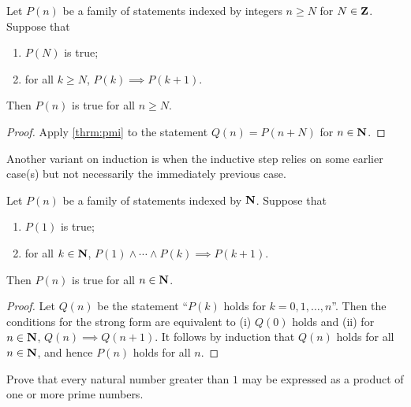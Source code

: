 \begin{corollary}
Let $P(n)$ be a family of statements indexed by integers $n \ge N$ for $N\in\mathbf Z$. Suppose that 
\begin{enumerate}[label=(\roman*)]
\item $P(N)$ is true;
\item for all $k \ge N$, $P(k) \implies P(k+1)$. 
\end{enumerate}
Then $P(n)$ is true for all $n \ge N$.
\end{corollary}

\begin{proof}
Apply \cref{thrm:pmi} to the statement $Q(n)=P(n+N)$ for $n\in\mathbf N$.
\end{proof}

Another variant on induction is when the inductive step relies on some earlier case(s) but not necessarily the immediately previous case.

\begin{theorem}
Let $P(n)$ be a family of statements indexed by $\mathbf N$. Suppose that
\begin{enumerate}[label=(\roman*)]
\item $P(1)$ is true;
\item for all $k\in\mathbf N$, $P(1)\land\cdots\land P(k)\implies P(k+1)$.
\end{enumerate}
Then $P(n)$ is true for all $n\in\mathbf N$.
\end{theorem}

\begin{proof}
Let $Q(n)$ be the statement ``$P(k)$ holds for $k=0,1,\dots,n$''. Then the conditions for the strong form are equivalent to (i) $Q(0)$ holds and (ii) for $n\in\mathbf N$, $Q(n)\implies Q(n+1)$. It follows by induction that $Q(n)$ holds for all $n\in\mathbf N$, and hence $P(n)$ holds for all $n$.
\end{proof}

\begin{exercise}
Prove that every natural number greater than $1$ may be expressed as a product of one or more prime numbers.
\end{exercise}


